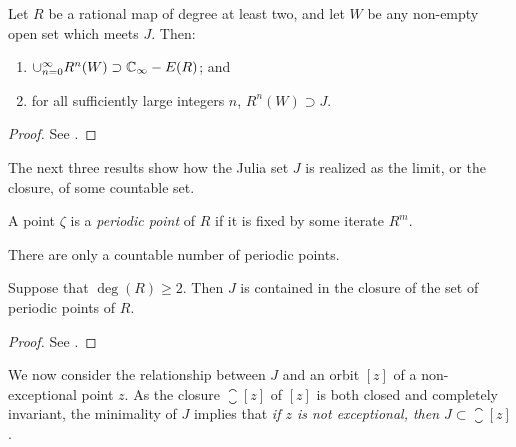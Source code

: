 \begin{theorem}
    \label{thm:union_of_iterates_of_an_open_set_that_meet_J_explode_to_ExtC_minus_exceptional_points}
    Let $R$ be a rational map of degree at least two, and let $W$ be any
    non-empty open set which meets $J$. Then:
    \begin{enumerate}[label=(\roman*)]
        \item $\cup_{n=0}^\infty R^n(W) \supset \mathbb{C}_\infty - E(R)$; and
        \item for all sufficiently large integers $n$, $R^n(W) \supset J$.
    \end{enumerate}
\end{theorem}
\begin{proof}
    See \cite[69]{Beardon1991}.
\end{proof}

The next three results show how the Julia set $J$ is realized as the limit, or
the closure, of some countable set.

\begin{definition}
    \label{def:periodic_point}
    A point $\zeta$ is a \emph{periodic point} of $R$ if it is fixed by some
    iterate $R^m$.
\end{definition}

\begin{remark}
    There are only a countable number of periodic points.
\end{remark}

\begin{theorem}
    \label{thm:J_contained_in_closure_of_periodic_points_set}
    Suppose that $\deg(R) \geq 2$. Then $J$ is contained in the closure of the
    set of periodic points of $R$.
\end{theorem}
\begin{proof}
    See \cite[70--71]{Beardon1991}.
\end{proof}

\begin{remark}
    We now consider the relationship between $J$ and an orbit $[z]$ of a
    non-exceptional point $z$. As the closure $\closure{[z]}$ of $[z]$ is both
    closed and completely invariant, the minimality of $J$ implies that \emph{if
    $z$ is not exceptional, then $J \subset \closure{[z]}$}.
\end{remark}

